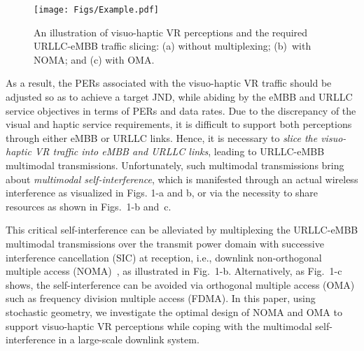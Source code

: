 \documentclass[conference]{IEEEtran}
\begin{document}
\begin{figure}%
\centering
\texttt{[image: Figs/Example.pdf]}
\caption{\small{An illustration of visuo-haptic VR perceptions and the required URLLC-eMBB traffic slicing: (a) without multiplexing; (b)~with NOMA; and (c) with OMA.}}
\end{figure}


As a result, the PERs associated with the visuo-haptic VR traffic should be adjusted so as to achieve a target JND, while abiding by the eMBB and URLLC service objectives in terms of PERs and data rates. Due to the discrepancy of the visual and haptic service requirements, it is difficult to support both perceptions through either eMBB or URLLC links. Hence, it is necessary to \emph{slice the visuo-haptic VR traffic into eMBB and URLLC links}, leading to URLLC-eMBB multimodal transmissions. Unfortunately, such multimodal transmissions bring about \emph{multimodal self-interference}, which is manifested through an actual wireless interference as visualized in Figs. 1-a and b, or via the necessity to share resources as shown in Figs.~1-b and~c.

This critical self-interference can be alleviated by multiplexing the URLLC-eMBB multimodal transmissions over the transmit power domain with successive interference cancellation (SIC) at reception, i.e., downlink non-orthogonal multiple access (NOMA)~\cite{3GPPMUST:2015}, as illustrated in Fig.~1-b. Alternatively, as Fig.~1-c shows, the self-interference can be avoided via orthogonal multiple access (OMA) such as frequency division multiple access (FDMA). In this paper, using stochastic geometry, we investigate the optimal design of NOMA and OMA to support visuo-haptic VR perceptions while coping with the multimodal self-interference in a large-scale downlink system.
\end{document}
